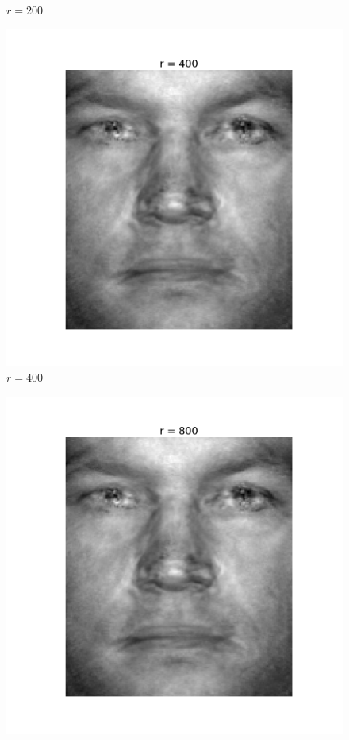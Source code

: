 \begin{enumerate}[label=\arabic*.]
\begin{mdframed}[style=MyFrame]
\begin{figure}[H]
                    \caption{$r=200$}
                \end{figure}
                \begin{figure}[H]
                    \includegraphics[height=0.35\textheight]{../media/r-400-1.png}
                    \caption{$r=400$}
                \end{figure}
                \begin{figure}[H]
                    \includegraphics[height=0.35\textheight]{../media/r-800-1.png}

\end{figure}
\end{mdframed}
\end{enumerate}
